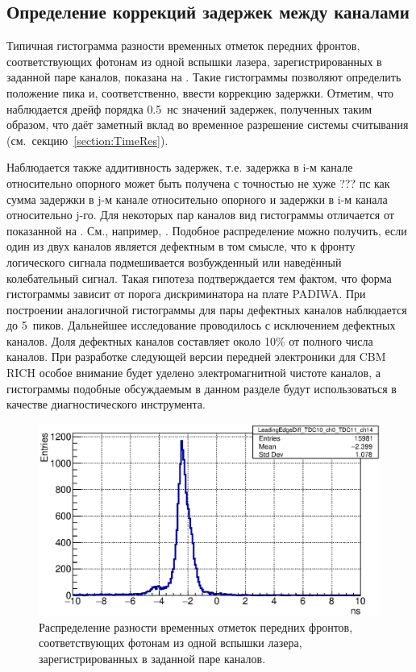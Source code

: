 \subsection{Определение коррекций задержек между каналами}\label{section:Corrections}

Типичная гистограмма разности временных отметок передних фронтов, соответствующих фотонам из одной вспышки лазера, зарегистрированных в заданной паре каналов, показана на . Такие гистограммы позволяют определить положение пика и, соответственно, ввести коррекцию задержки. Отметим, что наблюдается дрейф порядка 0.5~нс значений задержек, полученных таким образом, что даёт заметный вклад во временное разрешение системы считывания (см.~секцию~\ref{section:TimeRes}).

Наблюдается также аддитивность задержек, т.е. задержка в i-м канале относительно опорного может быть получена с точностью не хуже ??? пс как сумма задержки в j-м канале относительно опорного и задержки в i-м канала относительно j-го. Для некоторых пар каналов вид гистограммы отличается от показанной на . См., например, . Подобное распределение можно получить, если один из двух каналов является дефектным в том смысле, что к фронту логического сигнала подмешивается возбужденный или наведённый колебательный сигнал. Такая гипотеза подтверждается тем фактом, что форма гистограммы зависит от порога дискриминатора на плате PADIWA. При построении аналогичной гистограммы для пары дефектных каналов наблюдается до 5~пиков. Дальнейшее исследование проводилось с исключением дефектных каналов. Доля дефектных каналов составляет около 10\% от полного числа каналов. При разработке следующей версии передней электроники для CBM RICH особое внимание будет уделено электромагнитной чистоте каналов, а гистограммы подобные обсуждаемым в данном разделе будут использоваться в качестве диагностического инструмента.


\begin{figure}
\includegraphics[width=1.0\textwidth]{pictures/22_LeadingEdgeDiff_TDC10_ch0_TDC11_ch14_feb2017.eps}
\caption{Распределение разности временных отметок передних фронтов, соответствующих фотонам из одной вспышки лазера, зарегистрированных в заданной паре каналов.}
\label{fig:TypicalLeadingEdgeDiff}
\end{figure}

